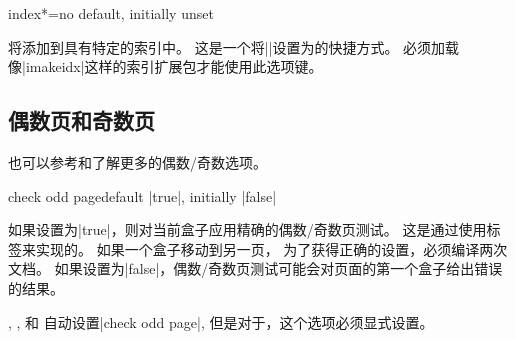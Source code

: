   \begin{docTcbKey}[][doc new=2018-07-26]{index*}{=}{no default, initially unset}
  
    将添加到具有特定的索引中。
    这是一个将|\index|设置为的快捷方式。
    必须加载像|imakeidx|这样的索引扩展包才能使用此选项键。
  \end{docTcbKey}
  
\subsection{偶数页和奇数页}

\begin{marker}
也可以参考和了解更多的偶数/奇数选项。
\end{marker}

\begin{docTcbKey}[][doc updated=2015-11-13]{check odd page}{}{default |true|, initially |false|}


如果设置为|true|，则对当前盒子应用精确的偶数/奇数页测试。%
这是通过使用标签来实现的。%
如果一个盒子移动到另一页，%
为了获得正确的设置，必须编译两次文档。%
如果设置为|false|，偶数/奇数页测试可能会对页面的第一个盒子给出错误的结果。

,
, 和
自动设置|check odd page|, 但是对于，这个选项必须显式设置。
\end{docTcbKey}


